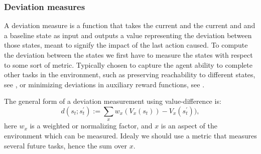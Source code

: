 \documentclass[12pt,A4]{report}
\theoremstyle{definition}
\begin{document}

\subsubsection{Deviation measures}
A deviation measure is a function that takes the current and the current and and a baseline state as input and outputs a value representing the deviation between those states, meant to signify the impact of the last action caused. To compute the deviation between the states we first have to measure the states with respect to some sort of metric. Typically chosen to capture the agent ability to complete other tasks in the environment, such as preserving reachability to different states, see \citet{Krakovna19}, or minimizing deviations in auxiliary reward functions, see \citet{Turner19}. 

The general form of a deviation measurement using value-difference is:
  \[d(s_t;s^{\prime}_t) := \sum_x w_x (V_x(s_t)) - V_x(s^{\prime}_t)) ,\]
here $w_x$ is a weighted or normalizing factor, and $x$ is an aspect of the environment which can be measured. Idealy we should use a metric that measures several future tasks, hence the sum over $x$.

\end{document}
